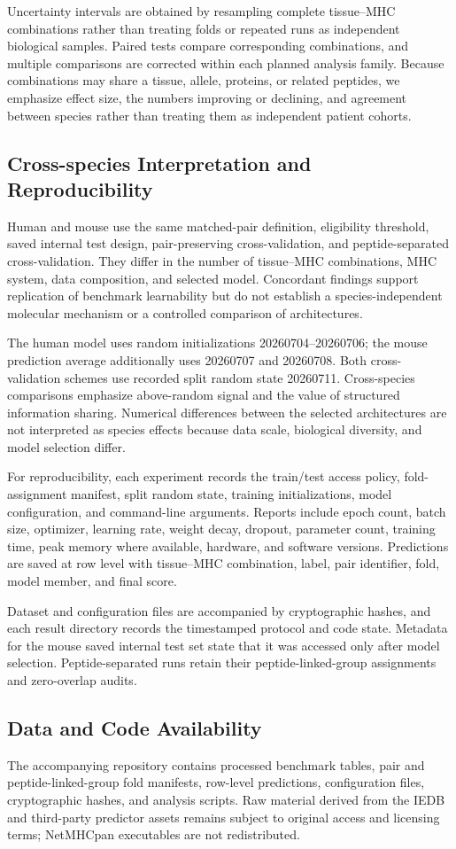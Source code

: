 Uncertainty intervals are obtained by resampling complete tissue--MHC combinations rather than treating folds or repeated runs as independent biological samples. Paired tests compare corresponding combinations, and multiple comparisons are corrected within each planned analysis family. Because combinations may share a tissue, allele, proteins, or related peptides, we emphasize effect size, the numbers improving or declining, and agreement between species rather than treating them as independent patient cohorts.

\subsection{Cross-species Interpretation and Reproducibility}

Human and mouse use the same matched-pair definition, eligibility threshold, saved internal test design, pair-preserving cross-validation, and peptide-separated cross-validation. They differ in the number of tissue--MHC combinations, MHC system, data composition, and selected model. Concordant findings support replication of benchmark learnability but do not establish a species-independent molecular mechanism or a controlled comparison of architectures.

The human model uses random initializations 20260704--20260706; the mouse prediction average additionally uses 20260707 and 20260708. Both cross-validation schemes use recorded split random state 20260711. Cross-species comparisons emphasize above-random signal and the value of structured information sharing. Numerical differences between the selected architectures are not interpreted as species effects because data scale, biological diversity, and model selection differ.

For reproducibility, each experiment records the train/test access policy, fold-assignment manifest, split random state, training initializations, model configuration, and command-line arguments. Reports include epoch count, batch size, optimizer, learning rate, weight decay, dropout, parameter count, training time, peak memory where available, hardware, and software versions. Predictions are saved at row level with tissue--MHC combination, label, pair identifier, fold, model member, and final score.

Dataset and configuration files are accompanied by cryptographic hashes, and each result directory records the timestamped protocol and code state. Metadata for the mouse saved internal test set state that it was accessed only after model selection. Peptide-separated runs retain their peptide-linked-group assignments and zero-overlap audits.

\subsection{Data and Code Availability}

The accompanying repository contains processed benchmark tables, pair and peptide-linked-group fold manifests, row-level predictions, configuration files, cryptographic hashes, and analysis scripts. Raw material derived from the IEDB and third-party predictor assets remains subject to original access and licensing terms; NetMHCpan executables are not redistributed.

